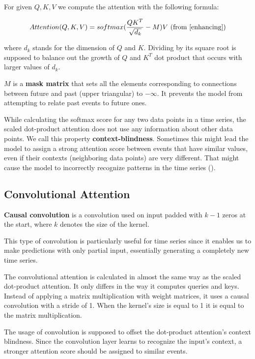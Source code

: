 \documentclass[en]{pracamgr}
\newcommand{\pk}[1]{\textcolor{red}{\small [pk: #1]}}
\begin{document}
	For given $Q, K, V$ we compute the attention with the following formula:
	
	$$ Attention(Q, K, V) = softmax(\frac{QK^{T}}{\sqrt{d_k}} - M)V \textrm{ (from \cite{enhancing})} $$
	
	where $d_k$ stands for the dimension of $Q$ and $K$. Dividing by its square root is supposed to balance out the growth of $Q$ and $K^{T}$ dot product that occurs with larger values of $d_k$.
	
	$M$ is a \textbf{mask matrix} that sets all the elements corresponding to connections between future and past (upper triangular) to $-\infty$. It prevents the model from attempting to relate past events to future ones.
	
	While calculating the softmax score for any two data points in a time series, the scaled dot-product attention does not use any information about other data points. We call this property \textbf{context-blindness}. Sometimes this might lead the model to assign a strong attention score between events that have similar values, even if their contexts (neighboring data points) are very different. That might cause the model to incorrectly recognize patterns in the time series (\cite{enhancing}). %
	
	\subsection{Convolutional Attention}
	
	\textbf{Causal convolution} is a convolution used on input padded with $k - 1$ zeros at the start, where $k$ denotes the size of the kernel.
	
	This type of convolution is particularly useful for time series since it enables us to make predictions with only partial input, essentially generating a completely new time series.
	\newline
	
	The convolutional attention \cite{enhancing} is calculated in almost the same way as the scaled dot-product attention. 
	It only differs in the way it computes queries and keys.
	Instead of applying a matrix multiplication with weight matrices, it uses a causal convolution with a stride of 1. When the kernel's size is equal to 1 it is equal to the matrix multiplication.
	
	The usage of convolution is supposed to offset the dot-product attention's context blindness. Since the convolution layer learns to recognize the input's context, a stronger attention score should be assigned to similar events.
	
\end{document}
